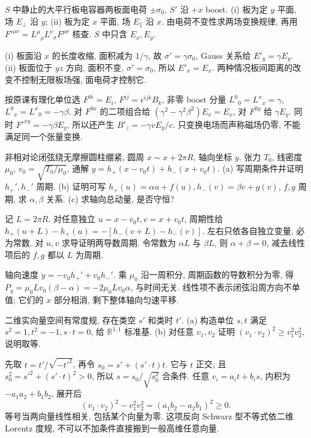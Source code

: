 \begin{exercise}
$S$ 中静止的大平行板电容器两板面电荷 $\pm\sigma_0$, $S'$ 沿 $+x$ boost.
(i) 板为定 $y$ 平面, 场 $E_\perp$ 沿 $y$; (ii) 板为定 $x$ 平面, 场 $E_\parallel$ 沿 $x$.
由电荷不变性求两场变换规律, 再用 $F'^{\mu\nu}=L^\mu{}_{\rho}L^\nu{}_{\sigma}F^{\rho\sigma}$ 核查. $S$ 中只含 $E_x,E_y$.
\end{exercise}
\begin{solution}
(i) 板面沿 $x$ 的长度收缩, 面积减为 $1/\gamma$, 故 $\sigma'=\gamma\sigma_0$, Gauss 关系给 $E'_y=\gamma E_y$.
(ii) 板面位于 $yz$ 方向, 面积不变, $\sigma'=\sigma_0$, 所以 $E'_x=E_x$. 两种情况板间距离的改变不控制无限板场强, 面电荷才控制它.

按原课有理化单位选 $F^{0i}=E_i$, $F^{ij}=\epsilon^{ijk}B_k$, 非零 boost 分量 $L^0{}_0=L^x{}_x=\gamma$, $L^0{}_x=L^x{}_0=-\gamma\beta$. 对 $F^{0x}$ 的二项组合给 $(\gamma^2-\gamma^2\beta^2)E_x=E_x$, 对 $F^{0y}$ 给 $\gamma E_y$. 同时 $F'^{xy}=-\gamma\beta E_y$, 所以还产生 $B'_z=-\gamma vE_y/c$. 只变换电场而声称磁场仍零, 不能满足同一个张量变换.
\end{solution}

\begin{exercise}
非相对论闭弦绕无摩擦圆柱绷紧, 圆周 $x\sim x+2\pi R$, 轴向坐标 $y$. 张力 $T_0$, 线密度 $\mu_0$, $v_0=\sqrt{T_0/\mu_0}$, 通解 $y=h_+(x-v_0t)+h_-(x+v_0t)$.
(a) 写周期条件并证明 $h_+',h_-'$ 周期.
(b) 证明可写 $h_+(u)=\alpha u+f(u),h_-(v)=\beta v+g(v)$, $f,g$ 周期, 求 $\alpha,\beta$ 关系.
(c) 求轴向总动量, 是否守恒?
\end{exercise}
\begin{solution}
记 $L=2\pi R$. 对任意独立 $u=x-v_0t,v=x+v_0t$, 周期性给 $h_+(u+L)-h_+(u)=-[h_-(v+L)-h_-(v)]$. 左右只依各自独立变量, 必为常数. 对 $u,v$ 求导证明两导数周期. 令常数为 $\alpha L$ 与 $\beta L$, 则 $\alpha+\beta=0$, 减去线性项后的 $f,g$ 都以 $L$ 为周期.

轴向速度 $\dot y=-v_0h_+'+v_0h_-'$. 乘 $\mu_0$ 沿一周积分, 周期函数的导数积分为零, 得 $P_y=\mu_0Lv_0(\beta-\alpha)=-2\mu_0Lv_0\alpha$, 与时间无关. 线性项不表示闭弦沿周方向不单值; 它们的 $x$ 部分相消, 剩下整体轴向匀速平移.
\end{solution}

\begin{exercise}
二维实向量空间有常度规, 存在类空 $s'$ 和类时 $t'$.
(a) 构造单位 $s,t$ 满足 $s^2=1,t^2=-1,s\cdot t=0$, 给 $\mathbb R^{1,1}$ 标准基.
(b) 对任意 $v_1,v_2$ 证明 $(v_1\cdot v_2)^2\ge v_1^2v_2^2$, 说明取等.
\end{exercise}
\begin{solution}
先取 $t=t'/\sqrt{-t'^2}$, 再令 $s_0=s'+(s'\cdot t)t$. 它与 $t$ 正交, 且 $s_0^2=s'^2+(s'\cdot t)^2>0$, 所以 $s=s_0/\sqrt{s_0^2}$ 合条件. 任意 $v_i=a_it+b_is$, 内积为 $-a_1a_2+b_1b_2$, 展开后
\[
(v_1\cdot v_2)^2-v_1^2v_2^2=(a_1b_2-a_2b_1)^2\ge0.
\]
等号当两向量线性相关, 包括某个向量为零. 这项反向 Schwarz 型不等式依二维 Lorentz 度规, 不可以不加条件直接搬到一般高维任意向量.
\end{solution}

